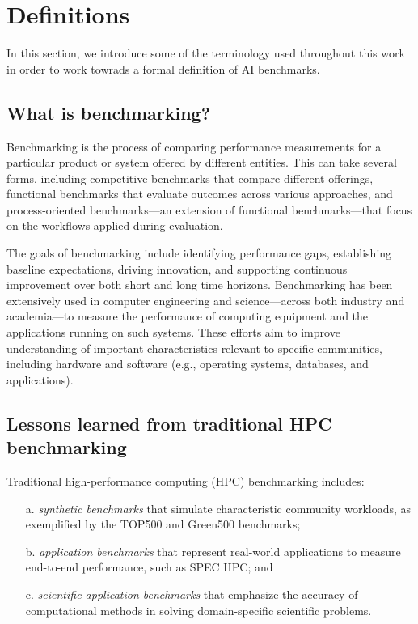 
\section{Definitions}
\label{sec:definition}

In this section, we introduce some of the terminology used throughout this work in order to work towrads a formal definition of AI benchmarks.

\subsection{What is benchmarking?}
\label{sec:definition-benchmarking}


Benchmarking is the process of comparing performance measurements for a particular product or system offered by different entities. This can take several forms, including competitive benchmarks that compare different offerings, functional benchmarks that evaluate outcomes across various approaches, and process-oriented benchmarks—an extension of functional benchmarks—that focus on the workflows applied during evaluation. 

The goals of benchmarking include identifying performance gaps, establishing baseline expectations, driving innovation, and supporting continuous improvement over both short and long time horizons. Benchmarking has been extensively used in computer engineering and science—across both industry and academia—to measure the performance of computing equipment and the applications running on such systems. These efforts aim to improve understanding of important characteristics relevant to specific communities, including hardware and software (e.g., operating systems, databases, and applications).


\subsection{Lessons learned from traditional HPC benchmarking}

Traditional high-performance computing (HPC) benchmarking includes:  

\begin{enumerate}
\item[a.] \textit{synthetic benchmarks} that simulate characteristic community workloads, as exemplified by the TOP500 and Green500 benchmarks;  
\item[b.] \textit{application benchmarks} that represent real-world applications to measure end-to-end performance, such as SPEC HPC; and  
\item[c.] \textit{scientific application benchmarks} that emphasize the accuracy of computational methods in solving domain-specific scientific problems.
\end{enumerate}


